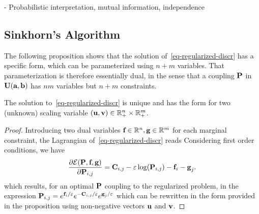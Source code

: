 - Probabilistic interpretation, mutual information, independence

\subsection{Sinkhorn's Algorithm}


The following proposition shows that the solution of~\eqref{eq-regularized-discr} has a specific form, which can be parameterized using $n+m$ variables. That parameterization is therefore essentially dual, in the sense that a coupling $\P$ in $\CouplingsD(\a,\b)$ has $nm$ variables but $n+m$ constraints.

\begin{prop}\label{prop-regularized-primal}
The solution to~\eqref{eq-regularized-discr} is unique and has the form
for two (unknown) scaling variable $(\uD,\vD) \in \RR_+^n \times \RR_+^m$. 
\end{prop} 

\begin{proof} 
Introducing two dual variables $\fD\in\RR^n,\gD\in\RR^m$ for each marginal constraint, the Lagrangian of~\eqref{eq-regularized-discr} reads
Considering first order conditions, we have
$$
	\frac{\partial\Lag(\P,\fD,\gD)}{\partial \P_{i,j}}= \C_{i,j} - \epsilon \log(\P_{i,j}) - \fD_i -\gD_j.
$$
which results, for an optimal $\P$ coupling to the regularized problem, in the expression $\P_{i,j}=e^{\fD_i/\varepsilon}e^{-\C_{i,j}/\varepsilon}e^{\gD_j/\varepsilon}$ which can be rewritten in the form provided in the proposition using non-negative vectors $\uD$ and $\vD$.
\end{proof} 

